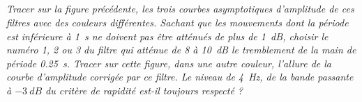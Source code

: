 \begin{multicols}{2}
\subparagraph{}\textit{Tracer sur la figure précédente, les trois courbes asymptotiques d’amplitude de ces filtres avec des couleurs différentes. 
Sachant que les mouvements dont la période est inférieure à \SI{1}{s} ne doivent pas être atténués de plus de \SI{1}{dB}, choisir le numéro 1, 2 ou 3 du filtre qui atténue de 8 à \SI{10}{dB} le tremblement de la main de période \SI{0,25}{s}. 
Tracer sur cette figure, dans une autre couleur, l’allure de la courbe d’amplitude corrigée par ce filtre.
Le niveau de \SI{4}{Hz}, de la bande passante à $-\SI{3}{dB}$ du critère de rapidité est-il toujours respecté ? 
}
\ifprof
\begin{corrige}
\end{corrige}
\else
\fi
%
%
%

\end{multicols}
%
%
%
%
%
%
